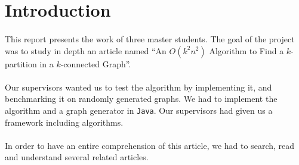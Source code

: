 \section{Introduction}
\paragraph{}
This report presents the work of three master students. The goal of the
project was to study in depth an article named ``An $O(k^2n^2)$ Algorithm to
Find a $k$-partition in a $k$-connected Graph''\cite{JS94}.

\paragraph{}
Our supervisors wanted us to test the algorithm by implementing it, and
benchmarking it on randomly generated graphs. We had to implement the
algorithm and a graph generator in \verb!Java!. Our supervisors had given us
a framework including algorithms.

\paragraph{}
In order to have an entire comprehension of this article, we had to search,
read and understand several related articles.

